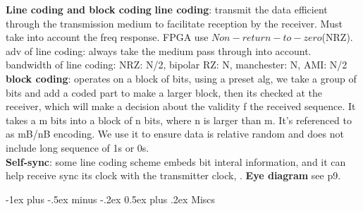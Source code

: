 \documentclass[10pt,landscape]{article}
\makeatletter
\renewcommand{\section}{\@startsection{section}{1}{0mm}%
                                {-1ex plus -.5ex minus -.2ex}%
                                {0.5ex plus .2ex}%
                                {\normalfont\large\bfseries}}
\theoremstyle{definition}
\makeatother
\begin{document}
\begin{multicols}{3}
\textbf{Line coding and block coding}
\textbf{line coding}: transmit the data efficient through the transmission medium to facilitate reception by the receiver. Must take into account the freq response. FPGA use $Non-return-to-zero$(NRZ). \\
adv of line coding: always take the medium pass through into account. \\
bandwidth of line coding: NRZ: N/2, bipolar RZ: N, manchester: N, AMI: N/2 \\

\textbf{block coding}:  operates on a block of bits, using a preset alg, we take a group of bits and add a coded part to make a larger block, then its checked at the receiver, which will make a decision about the validity f the received sequence. It takes a m bits into a block of n bits, where n is larger than m. It's referenced to as mB/nB encoding. We use it to ensure data is relative random and does not include long sequence of 1s or 0s. \\

\textbf{Self-sync}: some line coding scheme embeds bit interal information, and it can help receive sync its clock with the transmitter clock, .
\textbf{Eye diagram}
see p9. 





\section{Miscs}


\end{multicols}
\end{document}
